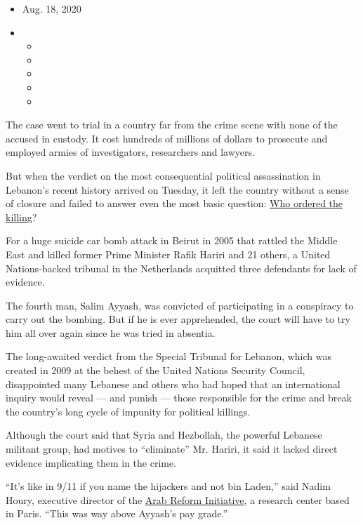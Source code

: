 \begin{itemize}
\item
  Aug. 18, 2020
\item
  \begin{itemize}
  \item
  \item
  \item
  \item
  \item
  \end{itemize}
\end{itemize}

The case went to trial in a country far from the crime scene with none
of the accused in custody. It cost hundreds of millions of dollars to
prosecute and employed armies of investigators, researchers and lawyers.

But when the verdict on the most consequential political assassination
in Lebanon's recent history arrived on Tuesday, it left the country
without a sense of closure and failed to answer even the most basic
question:
\href{https://www.nytimes3xbfgragh.onion/2020/08/08/world/middleeast/hariri-assassination-trial-hague.html}{Who
ordered the killing}?

For a huge suicide car bomb attack in Beirut in 2005 that rattled the
Middle East and killed former Prime Minister Rafik Hariri and 21 others,
a United Nations-backed tribunal in the Netherlands acquitted three
defendants for lack of evidence.

The fourth man, Salim Ayyash, was convicted of participating in a
conspiracy to carry out the bombing. But if he is ever apprehended, the
court will have to try him all over again since he was tried in
absentia.

The long-awaited verdict from the Special Tribunal for Lebanon, which
was created in 2009 at the behest of the United Nations Security
Council, disappointed many Lebanese and others who had hoped that an
international inquiry would reveal --- and punish --- those responsible
for the crime and break the country's long cycle of impunity for
political killings.

Although the court said that Syria and Hezbollah, the powerful Lebanese
militant group, had motives to ``eliminate'' Mr. Hariri, it said it
lacked direct evidence implicating them in the crime.

``It's like in 9/11 if you name the hijackers and not bin Laden,'' said
Nadim Houry, executive director of the
\href{https://www.arab-reform.net/}{Arab Reform Initiative}, a research
center based in Paris. ``This was way above Ayyash's pay grade.''

